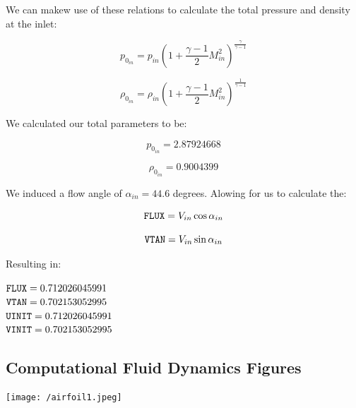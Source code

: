 \documentclass[titlepage]{article}
\begin{document}
We can makew use of these relations to calculate the total pressure and density at the inlet:

\begin{equation}
\label{eq:total pressure}
p_{0_{in}} = p_{in} \left( 1 + \frac{\gamma-1}{2} M_{in}^{2} \right)^{\frac{\gamma}{\gamma - 1}}
\end{equation}

\begin{equation}
\label{eq:total density}
\rho_{0_{in}} = \rho_{in} \left( 1 + \frac{\gamma-1}{2} M_{in}^{2} \right)^{\frac{1}{\gamma - 1}}
\end{equation}

We calculated our total parameters to be:

\begin{equation}
\label{eq:total pressure}
p_{0_{in}} = 2.87924668
\end{equation}

\begin{equation}
\label{eq:total density}
\rho_{0_{in}} = 0.9004399
\end{equation}

We induced a flow angle of $\alpha_{in} = 44.6$ degrees. 
Alowing for us to calculate the:

\begin{equation}
\label{eq:FLUX}
\verb|FLUX| = V_{in} \cos{\alpha_{in}}
\end{equation}

\begin{equation}
\label{eq:VTAN}
\verb|VTAN| = V_{in} \sin{\alpha_{in}}
\end{equation}

Resulting in:

\begin{center}
  $\verb|FLUX| = 0.712026045991$ \\
  $\verb|VTAN| = 0.702153052995$ \\
  $\verb|UINIT| = 0.712026045991$ \\
  $\verb|VINIT| = 0.702153052995$ \\
\end{center}

\subsection{Computational Fluid Dynamics Figures}

\begin{center}
    \texttt{[image: /airfoil1.jpeg]}
\end{center}
\end{document}
